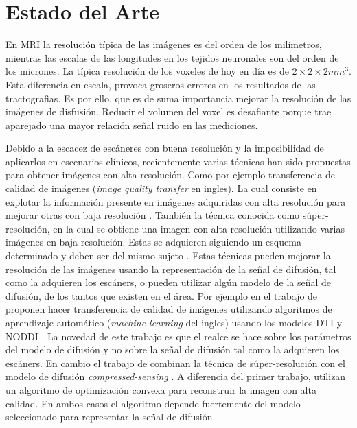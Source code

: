 
\chapter{Estado del Arte}

En MRI la resoluci\'on t\'ipica de las im\'agenes es del orden de los mil\'imetros, mientras las 
escalas de las longitudes en los tejidos neuronales son del orden de los micrones. La t\'ipica 
resoluci\'on de los voxeles de hoy en d\'ia es de $2\times2\times2 mm^3$. Esta diferencia en 
escala, provoca groseros errores en los resultados de las tractografias. Es por ello, que es de 
suma importancia mejorar la resoluci\'on de las im\'agenes de disfusi\'on. Reducir el volumen del 
voxel es desafiante porque trae aparejado una mayor relaci\'on se\~nal ruido en las mediciones. 

Debido a la escacez de escáneres con buena resolución y la imposibilidad de aplicarlos en 
escenarios 
clínicos, recientemente varias técnicas han sido propuestas para obtener imágenes con alta 
resolución. Como 
por ejemplo transferencia de calidad de imágenes (\textit{image quality transfer} en ingles). La 
cual 
consiste en explotar la 
información presente en imágenes adquiridas con alta resolución para mejorar otras con baja 
resolución 
\citep{Alexander2014}. También la técnica conocida como súper-resolución, en 
la cual se obtiene una imagen con alta resolución utilizando varias imágenes en baja resolución. 
Estas se adquieren siguiendo un esquema determinado y deben ser del mismo sujeto 
\citep{Irani1993,Robinson2010,Ning2016}. Estas técnicas pueden mejorar la resolución de las 
imágenes 
usando la 
representación de la señal de difusión, tal como la adquieren los escáners, o pueden utilizar algún 
modelo de la señal 
de difusión, de los tantos que existen en el área.
Por ejemplo en el trabajo de \citet{Alexander2014} proponen hacer transferencia de 
calidad de imágenes utilizando algoritmos de aprendizaje automático (\textit{machine learning} del 
ingles) usando los 
modelos DTI y NODDI \citep{Zhang2012}. 
La novedad de este trabajo es que el realce se hace sobre los parámetros del modelo de difusión y 
no 
sobre la 
señal de difusión tal como la adquieren los escáners. En cambio el trabajo de \citet{Ning2016} 
combinan la t\'ecnica 
de súper-resolución con el modelo de difusión \textit{compressed-sensing} \citep{Naidoo2015}. A 
diferencia del primer 
trabajo, utilizan un algoritmo de optimización convexa para reconstruir la imagen con alta calidad. 
En ambos casos el 
algoritmo depende fuertemente del modelo seleccionado para representar la señal de difusión.
